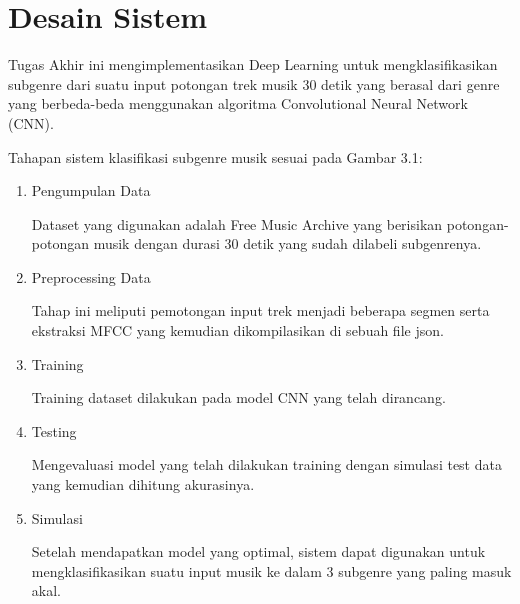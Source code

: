\section{Desain Sistem}
\label{sec:desainsistem}

Tugas Akhir ini mengimplementasikan Deep Learning untuk mengklasifikasikan subgenre dari suatu input potongan trek musik 30 detik yang berasal dari genre yang berbeda-beda menggunakan algoritma Convolutional Neural Network (CNN).

Tahapan sistem klasifikasi subgenre musik sesuai pada Gambar 3.1:

\begin{enumerate}
	\item Pengumpulan Data
	
	Dataset yang digunakan adalah Free Music Archive yang berisikan potongan-potongan musik dengan durasi 30 detik yang sudah dilabeli subgenrenya.
	\item Preprocessing Data
	
	Tahap ini meliputi pemotongan input trek menjadi beberapa segmen serta ekstraksi MFCC yang kemudian dikompilasikan di sebuah file json.
	\item Training
	
	Training dataset dilakukan pada model CNN yang telah dirancang.
	
	\item Testing
	
	Mengevaluasi model yang telah dilakukan training dengan simulasi test data yang kemudian dihitung akurasinya.
	
	\item Simulasi
	
	Setelah mendapatkan model yang optimal, sistem dapat digunakan untuk mengklasifikasikan suatu input musik ke dalam 3 subgenre yang paling masuk akal.
	
\end{enumerate}

